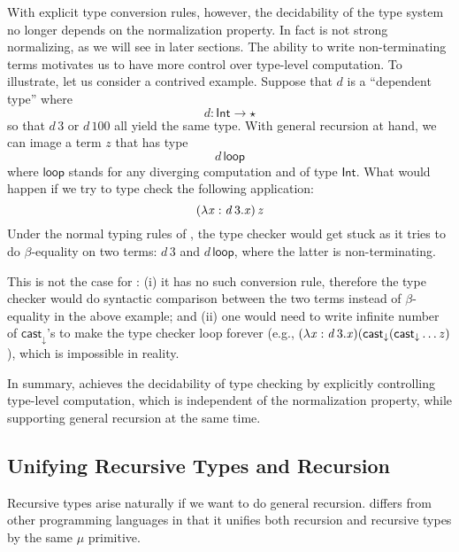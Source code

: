 With explicit type conversion rules, however, the decidability of the type system no longer depends on the normalization property. In fact \name is not strong normalizing, as we will see in later sections. The ability to write non-terminating terms motivates us to have more control over type-level computation. To illustrate, let us consider a contrived example. Suppose that $d$ is a ``dependent type'' where \[d : \mathsf{Int}  \rightarrow  \star\] so that $d\,3$ or $d\,100$ all yield the same type.  With general recursion at hand, we can image  a term $z$ that has type \[d\,\mathsf{loop}\] where $\mathsf{loop}$ stands for any diverging computation and of type $ \mathsf{Int} $. What would happen if we try to type check the following application: \[ (  \lambda  \mathit{x}  :  \mathit{d} \, 3  .  \mathit{x}  ) \, \mathit{z}\] Under the normal typing rules of \coc, the type checker would get stuck as it tries to do $\beta$-equality on two terms: $d\,3$ and $d\,\mathsf{loop}$, where the latter is non-terminating.

This is not the case for \name: (i) it has no such conversion rule, therefore the type checker would do syntactic comparison between the two terms instead of $\beta$-equality in the above example; and (ii) one would need to write infinite number of $ \mathsf{cast}_{\downarrow} $'s to make the type checker loop forever (e.g., $(\lambda  \mathit{x}  :  \mathit{d} \, 3  .  \mathit{x})( \mathsf{cast}_{\downarrow} ( \mathsf{cast}_{\downarrow}  \dots z) $), which is impossible in reality.

In summary, \name achieves the decidability of type checking by explicitly controlling type-level computation, which is independent of the normalization property, while supporting general recursion at the same time.

\subsection{Unifying Recursive Types and Recursion}


Recursive types arise naturally if we want to do general recursion. \name differs from other programming languages in that it unifies both recursion and recursive types by the same $\mu$ primitive.

